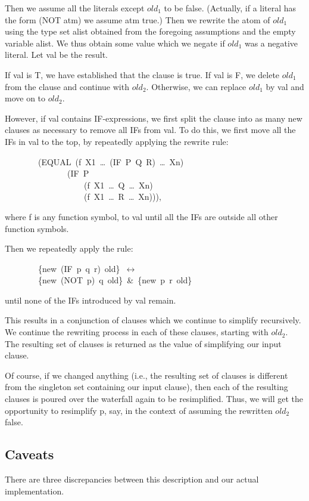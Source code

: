 \documentclass[11pt]{book}
\newenvironment{pubasis}{\begin{flushleft}\ttfamily\small}{\normalsize\rmfamily\end{flushleft}}
\newcommand{\pubdefaulttextsize}{\large}
\begin{document}
Then we  assume all the literals except $old_{1}$ to be false.  (Actually,
if a literal has the form (NOT atm) we assume atm true.)
Then we rewrite the atom of $old_{1}$ using the type set
alist obtained from the foregoing assumptions and the empty
variable alist.  We thus obtain some
value which we negate if $old_{1}$ was a negative literal.  Let val be the result.

If val is T, we have established that the clause is true.
If val is F, we delete $old_{1}$ from the clause and continue with
$old_{2}$.
Otherwise, we can replace $old_{1}$ by val and move on
to $old_{2}$.

However, if val contains IF-expressions, we first
split the clause into as many new clauses as necessary to remove all
IFs from val.  To do this, we
first move all the IFs in val to the top, by repeatedly
applying the rewrite rule:
\begin{pubasis}
~~~~~~~~(EQUAL~(f~X1~\ldots{}~(IF~P~Q~R)~\ldots{}~Xn)\\
~~~~~~~~~~~~~~~(IF~P\\
~~~~~~~~~~~~~~~~~~~(f~X1~\ldots{}~Q~\ldots{}~Xn)\\
~~~~~~~~~~~~~~~~~~~(f~X1~\ldots{}~R~\ldots{}~Xn))),\\
\end{pubasis}
where f is any function symbol,
to val until all the IFs are outside all other
function symbols.

Then we repeatedly apply the rule:
\begin{pubasis}
~~~~~~~~\{new~(IF~p~q~r)~old\}~$\leftrightarrow$\\
~~~~~~~~\{new~(NOT~p)~q~old\}~\&~\{new~p~r~old\}\\
\end{pubasis}
until none of the IFs introduced by val remain.

This results in a conjunction of clauses which we continue to
simplify recursively.  We continue the rewriting process in each of these clauses, starting with $old_{2}$.
The resulting set of
clauses is returned as the value of  simplifying our input clause.

Of course, if we changed anything (i.e., the resulting set of clauses
is different from the singleton set containing our input clause), then
each of the resulting clauses is poured over the waterfall again to
be resimplified.
Thus, we will get the opportunity to resimplify p, say, in the context of assuming
the rewritten $old_{2}$ false.
\subsection{Caveats}
\pubdefaulttextsize
There are three discrepancies between this description and our
actual implementation.
\end{document}
